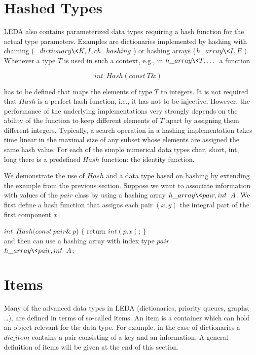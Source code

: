 \section{Hashed Types} \label{Hashed Types}

LEDA also contains parameterized data types requiring a hash function
for the actual type parameters. Examples are dictionaries implemented 
by hashing with chaining ($\_dictionary\<K,I,ch\_hashing\>$)
or hashing arrays ($h\_array\<I,E\>$).  Whenever a type $T$ is used in such
a context, e.g., in $h\_array\<T,\dots\>$ a function 

$$int\ \ Hash(const\ T\&)$$

has to be defined that maps the elements of type $T$ to integers. It is not
required that $Hash$ is a perfect hash function, i.e., it has not to be
injective. However, the performance of the underlying implementations
very strongly depends on the ability of the function to keep different
elements of $T$ apart by assigning them different integers.
Typically, a search operation in a hashing implementation takes time
linear in the maximal size of any subset whose elements are assigned the
same hash value.
For each of the simple numerical data types char, short, int, long
there is a predefined $Hash$ function: the identity function.

We demonstrate the use of $Hash$ and a data type based on hashing
by extending the example from the previous section. Suppose we
want to associate information with values of the $pair$ class
by using a hashing array $h\_array\<pair,int\>\ A$. We first
define a hash function that assigns each pair $(x,y)$
the integral part of the first component $x$

$int \ \ Hash(const\ pair\&\ p$) $\{$ return $int(p.x)$; $\}$\\

and then can use a hashing array with index type $pair$\\

$h\_array\<pair,int\>\ A$;






\section{Items }

\label{Items}
Many of the advanced data types in LEDA (dictionaries, priority queues, 
graphs, \dots), are defined in terms of so-called items. 
An item is a container which can hold an object
relevant for the data type. For example, in the case of dictionaries a
$dic\_item$ contains a pair consisting of a key and an information.
A general definition of items will be given at the end of this section. 

